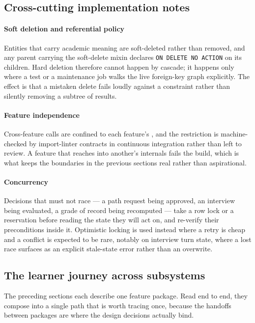 \subsection{Cross-cutting implementation notes}

\paragraph{Soft deletion and referential policy}
Entities that carry academic meaning are soft-deleted rather than removed, and any parent carrying the soft-delete mixin declares \texttt{ON DELETE NO ACTION} on its children. Hard deletion therefore cannot happen by cascade; it happens only where a test or a maintenance job walks the live foreign-key graph explicitly. The effect is that a mistaken delete fails loudly against a constraint rather than silently removing a subtree of results.

\paragraph{Feature independence}
Cross-feature calls are confined to each feature's , and the restriction is machine-checked by import-linter contracts in continuous integration rather than left to review. A feature that reaches into another's internals fails the build, which is what keeps the boundaries in the previous sections real rather than aspirational.

\paragraph{Concurrency}
Decisions that must not race --- a path request being approved, an interview being evaluated, a grade of record being recomputed --- take a row lock or a reservation before reading the state they will act on, and re-verify their preconditions inside it. Optimistic locking is used instead where a retry is cheap and a conflict is expected to be rare, notably on interview turn state, where a lost race surfaces as an explicit stale-state error rather than an overwrite.

\subsection{The learner journey across subsystems}

The preceding sections each describe one feature package. Read end to end, they compose into a single path that is worth tracing once, because the handoffs between packages are where the design decisions actually bind.

